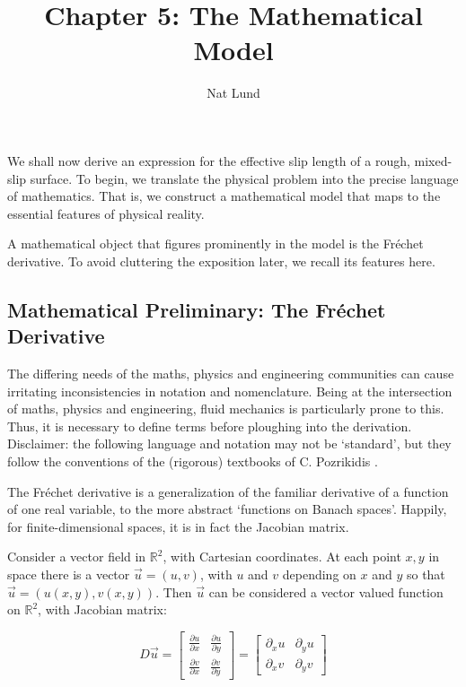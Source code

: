 \documentclass[a4paper]{report}
\title{Chapter 5: The Mathematical Model}
\author{Nat Lund}
\begin{document}
\maketitle

We shall now derive an expression for the effective slip length of a rough, mixed-slip surface.  To begin, we translate the physical problem into the precise language of mathematics.  That is, we construct a mathematical model that maps to the essential features of physical reality.

A mathematical object that figures prominently in the model is the Fr\'{e}chet derivative.  To avoid cluttering the exposition later, we recall its features here.


\subsection*{Mathematical Preliminary: The Fr\'{e}chet Derivative}


The differing needs of the maths, physics and engineering communities can cause irritating inconsistencies in notation and nomenclature.  Being at the intersection of maths, physics and engineering, fluid mechanics is particularly prone to this.  Thus, it is necessary to define terms before ploughing into the derivation.  Disclaimer: the following language and notation may not be `standard', but they follow the conventions of the (rigorous) textbooks of C. Pozrikidis \cite{Pozrikidis1997, Pozrikidis2001}.


The Fr\'{e}chet derivative is a generalization of the familiar derivative of a function of one real variable, to the more abstract `functions on Banach spaces'.  Happily, for finite-dimensional spaces, it is in fact the Jacobian matrix.

Consider a vector field in $\mathbb{R}^2$, with Cartesian coordinates.  At each point $x,y$ in space there is a vector $\vec{u} = (u,v)$, with $u$ and $v$ depending on $x$ and $y$ so that $\vec{u} = (u(x,y),v(x,y))$.  Then $\vec{u}$ can be considered a vector valued function on $\mathbb{R}^2$, with Jacobian matrix:

\begin{equation}
D \vec{u} = 
\begin{bmatrix}
\frac{\partial u}{\partial x} & \frac{\partial u}{\partial y} \\
\frac{\partial v}{\partial x} & \frac{\partial v}{\partial y}
\end{bmatrix}
=
\begin{bmatrix}
\partial_x u & \partial_y u \\
\partial_x v & \partial_y v
\end{bmatrix}
\end{equation}
\end{document}
